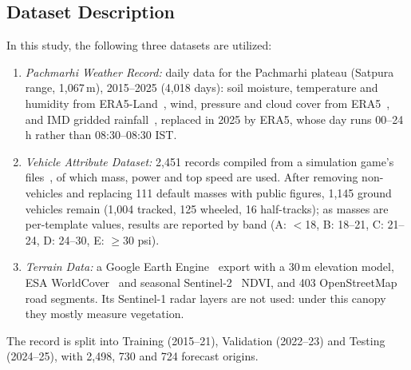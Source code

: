 \documentclass[conference]{IEEEtran}
\begin{document}
\subsection{Dataset Description}
In this study, the following three datasets are utilized:
\begin{enumerate}
  \item \emph{Pachmarhi Weather Record:} daily data for the Pachmarhi plateau (Satpura range,
  1,067\,m), 2015--2025 (4,018 days): soil moisture, temperature and humidity from
  ERA5-Land~\cite{munoz2021}, wind, pressure and cloud cover from ERA5~\cite{hersbach2020}, and
  IMD gridded rainfall~\cite{pai2014}, replaced in 2025 by ERA5, whose day runs 00--24\,h rather
  than 08:30--08:30 IST.
  \item \emph{Vehicle Attribute Dataset:} 2,451 records compiled from a simulation game's files~\cite{warthunder},
  of which mass, power and top speed are used. After removing non-vehicles and replacing 111
  default masses with public figures, 1,145 ground vehicles remain (1,004 tracked, 125 wheeled,
  16 half-tracks); as masses are per-template values, results are reported by band (A: $<$18,
  B: 18--21, C: 21--24, D: 24--30, E: $\geq$30 psi).
  \item \emph{Terrain Data:} a Google Earth Engine~\cite{gorelick2017} export with a 30\,m elevation model, ESA
  WorldCover~\cite{zanaga2022} and seasonal Sentinel-2~\cite{drusch2012} NDVI, and 403 OpenStreetMap~\cite{haklay2008} road
  segments. Its Sentinel-1 radar layers are not used: under this canopy they mostly
  measure vegetation.
\end{enumerate}
The record is split into Training (2015--21), Validation (2022--23) and Testing (2024--25), with
2,498, 730 and 724 forecast origins.
\end{document}
